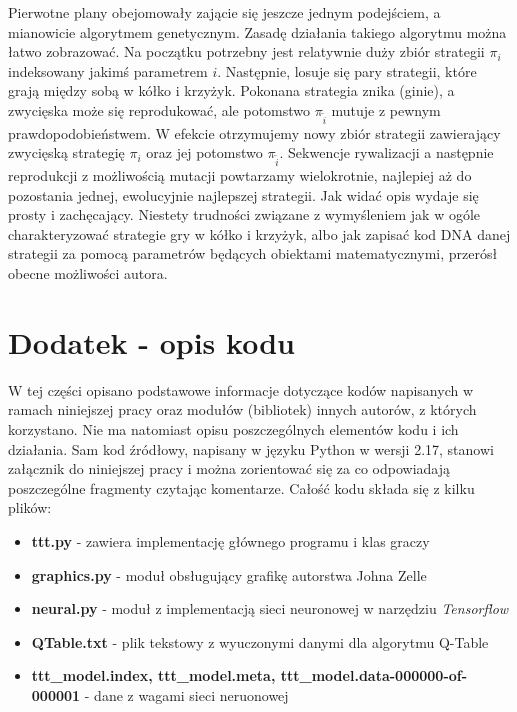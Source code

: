 \documentclass[licencjacka]{pracamgr}
\begin{document}
Pierwotne plany obejomowały zającie się jeszcze jednym podejściem, a mianowicie algorytmem genetycznym. Zasadę działania takiego algorytmu można łatwo zobrazować. Na początku potrzebny jest relatywnie duży zbiór strategii $\pi_{i}$ indeksowany jakimś parametrem $i$. Następnie, losuje się pary strategii, które grają między sobą w kółko i krzyżyk. Pokonana strategia znika (ginie), a zwycięska może się reprodukować, ale potomstwo $\pi_{\tilde{i}}$ mutuje z pewnym prawdopodobieństwem. W efekcie otrzymujemy nowy zbiór strategii zawierający zwycięską strategię $\pi_{i}$ oraz jej potomstwo $\pi_{\tilde{i}}$.  Sekwencje rywalizacji a następnie reprodukcji z możliwością mutacji powtarzamy wielokrotnie, najlepiej aż do pozostania jednej, ewolucyjnie najlepszej strategii. Jak widać opis wydaje się prosty i zachęcający. Niestety trudności związane z wymyśleniem jak w ogóle charakteryzować strategie gry w kółko i krzyżyk, albo jak zapisać kod DNA danej strategii za pomocą parametrów będących obiektami matematycznymi, przerósł obecne możliwości autora. 

\appendix

\chapter{Dodatek - opis kodu}
W tej części opisano podstawowe informacje dotyczące kodów napisanych w ramach niniejszej pracy oraz modułów (bibliotek) innych autorów, z których korzystano. Nie ma natomiast opisu poszczególnych elementów kodu i ich działania. Sam kod źródłowy, napisany w języku Python w wersji 2.17, stanowi załącznik do niniejszej pracy i można zorientować się za co odpowiadają poszczególne fragmenty czytając komentarze. Całość kodu składa się z kilku plików:
\begin{itemize}
	\item{\textbf{ttt.py} - zawiera implementację głównego programu i klas graczy}
	\item{\textbf{graphics.py} - moduł obsługujący grafikę autorstwa Johna Zelle \cite{Graphics}}
	\item{\textbf{neural.py} - moduł z implementacją sieci neuronowej w narzędziu \textit{Tensorflow}}
	\item{\textbf{QTable.txt} - plik tekstowy z wyuczonymi danymi dla algorytmu Q-Table}
	\item{ \textbf{ttt\_model.index, ttt\_model.meta, ttt\_model.data-000000-of-000001} - dane z wagami sieci neruonowej}
\end{itemize}
\end{document}
